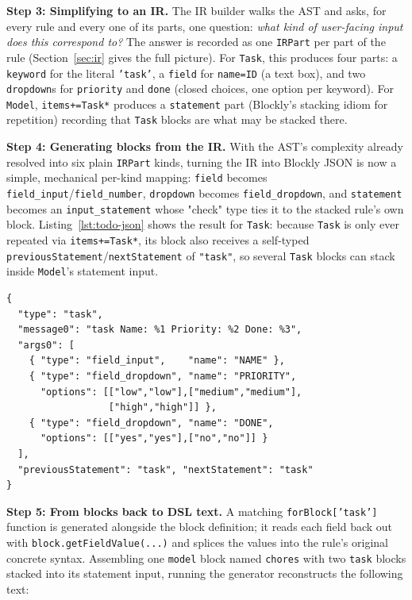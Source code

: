 \documentclass[runningheads]{llncs}
\begin{document}
\textbf{Step 3: Simplifying to an IR.}\label{step3} The IR builder walks the AST and asks, for every rule and every one of its parts, one question: \emph{what kind of user-facing input does this correspond to?} The answer is recorded as one \texttt{IRPart} per part of the rule (Section~\ref{sec:ir} gives the full picture). For \texttt{Task}, this produces four parts: a \texttt{keyword} for the literal \texttt{'task'}, a \texttt{field} for \texttt{name=ID} (a text box), and two \texttt{dropdown}s for \texttt{priority} and \texttt{done} (closed choices, one option per keyword). For \texttt{Model}, \texttt{items+=Task*} produces a \texttt{statement} part (Blockly's stacking idiom for repetition) recording that \texttt{Task} blocks are what may be stacked there.

\textbf{Step 4: Generating blocks from the IR.}\label{step4} With the AST's complexity already resolved into six plain \texttt{IRPart} kinds, turning the IR into Blockly JSON is now a simple, mechanical per-kind mapping: \texttt{field} becomes \texttt{field\_input}/\texttt{field\_number}, \texttt{dropdown} becomes \texttt{field\_dropdown}, and \texttt{statement} becomes an \texttt{input\_statement} whose "check" type ties it to the stacked rule's own block. Listing~\ref{lst:todo-json} shows the result for \texttt{Task}: because \texttt{Task} is only ever repeated via \texttt{items+=Task*}, its block also receives a self-typed \texttt{previousStatement}/\texttt{nextStatement} of \texttt{"task"}, so several \texttt{Task} blocks can stack inside \texttt{Model}'s statement input.

\begin{lstlisting}[caption={Generated block JSON for the \texttt{Task} rule (excerpt)}, label=lst:todo-json, float]
{
  "type": "task",
  "message0": "task Name: %1 Priority: %2 Done: %3",
  "args0": [
    { "type": "field_input",    "name": "NAME" },
    { "type": "field_dropdown", "name": "PRIORITY",
      "options": [["low","low"],["medium","medium"],
                  ["high","high"]] },
    { "type": "field_dropdown", "name": "DONE",
      "options": [["yes","yes"],["no","no"]] }
  ],
  "previousStatement": "task", "nextStatement": "task"
}
\end{lstlisting}

\textbf{Step 5: From blocks back to DSL text.}\label{step5} A matching \texttt{forBlock['task']} function is generated alongside the block definition; it reads each field back out with \texttt{block.getFieldValue(...)} and splices the values into the rule's original concrete syntax. Assembling one \texttt{model} block named \texttt{chores} with two \texttt{task} blocks stacked into its statement input, running the generator reconstructs the following text:
\end{document}
